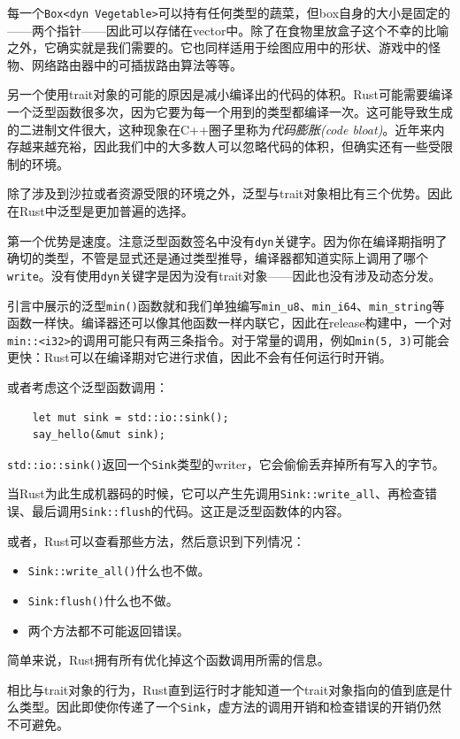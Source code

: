 每一个\texttt{Box<dyn Vegetable>}可以持有任何类型的蔬菜，但box自身的大小是固定的——两个指针——因此可以存储在vector中。除了在食物里放盒子这个不幸的比喻之外，它确实就是我们需要的。它也同样适用于绘图应用中的形状、游戏中的怪物、网络路由器中的可插拔路由算法等等。

另一个使用trait对象的可能的原因是减小编译出的代码的体积。Rust可能需要编译一个泛型函数很多次，因为它要为每一个用到的类型都编译一次。这可能导致生成的二进制文件很大，这种现象在C++圈子里称为\emph{代码膨胀(code bloat)}。近年来内存越来越充裕，因此我们中的大多数人可以忽略代码的体积，但确实还有一些受限制的环境。

除了涉及到沙拉或者资源受限的环境之外，泛型与trait对象相比有三个优势。因此在Rust中泛型是更加普遍的选择。

第一个优势是速度。注意泛型函数签名中没有\texttt{dyn}关键字。因为你在编译期指明了确切的类型，不管是显式还是通过类型推导，编译器都知道实际上调用了哪个\texttt{write}。没有使用\texttt{dyn}关键字是因为没有trait对象——因此也没有涉及动态分发。

引言中展示的泛型\texttt{min()}函数就和我们单独编写\texttt{min\_u8}、\texttt{min\_i64}、\texttt{min_string}等函数一样快。编译器还可以像其他函数一样内联它，因此在release构建中，一个对\texttt{min::<i32>}的调用可能只有两三条指令。对于常量的调用，例如\texttt{min(5, 3)}可能会更快：Rust可以在编译期对它进行求值，因此不会有任何运行时开销。

或者考虑这个泛型函数调用：
\begin{verbatim}
    let mut sink = std::io::sink();
    say_hello(&mut sink);
\end{verbatim}

\texttt{std::io::sink()}返回一个\texttt{Sink}类型的writer，它会偷偷丢弃掉所有写入的字节。

当Rust为此生成机器码的时候，它可以产生先调用\texttt{Sink::write\_all}、再检查错误、最后调用\texttt{Sink::flush}的代码。这正是泛型函数体的内容。

或者，Rust可以查看那些方法，然后意识到下列情况：
\begin{itemize}
    \item \texttt{Sink::write\_all()}什么也不做。
    \item \texttt{Sink:flush()}什么也不做。
    \item 两个方法都不可能返回错误。
\end{itemize}

简单来说，Rust拥有所有优化掉这个函数调用所需的信息。

相比与trait对象的行为，Rust直到运行时才能知道一个trait对象指向的值到底是什么类型。因此即使你传递了一个\texttt{Sink}，虚方法的调用开销和检查错误的开销仍然不可避免。

